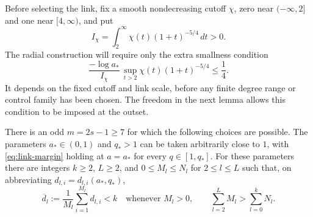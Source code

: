 Before selecting the link, fix a smooth nondecreasing cutoff \(\chi\),
zero near \(( -\infty,2]\) and one near \([4,\infty)\), and put
\[
 I_\chi=\int_2^\infty\chi(t)(1+t)^{-5/4}\,dt>0.
\]
The radial construction will require only the extra smallness condition
\begin{equation}\label{eq:cutoff-smallness}
 \frac{-\log a_*}{I_\chi}\,
 \sup_{t>2}\chi(t)(1+t)^{-5/4}\leq\frac14.
\end{equation}
It depends on the fixed cutoff and link scale, before any finite degree
range or control family has been chosen. The freedom in the next lemma
allows this condition to be imposed at the outset.

\begin{lemma}\label{lem:spectral-surplus}
There is an odd $m=2s-1\ge7$ for which the following choices are possible.
The parameters $a_*\in(0,1)$ and $q_*>1$ can be taken arbitrarily close
to $1$, with \eqref{eq:link-margin} holding at $a=a_*$ for every
$q\in[1,q_*]$.
For these parameters there are integers $k\ge2$, $L\ge2$, and
$0\le M_l\le N_l$ for $2\le l\le L$ such that, on abbreviating
$d_{l,i}=d_{l,i}(a_*,q_*)$,
\begin{equation}\label{eq:selection}
 \overline d_l:=\frac1{M_l}\sum_{i=1}^{M_l}d_{l,i}<k
 \quad\text{whenever }M_l>0,
 \qquad
 \sum_{l=2}^L M_l>\sum_{l=0}^k N_l.
\end{equation}
\end{lemma}

